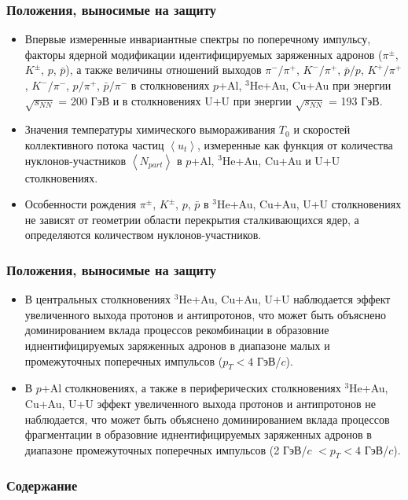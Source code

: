 \begin{frame}
    \setcounter{framenumber}{1}
    \maketitle
\end{frame}

\begin{frame}
    \frametitle{Положения, выносимые на защиту}
    \begin{itemize}
       	\item Впервые измеренные инвариантные спектры по поперечному импульсу, факторы ядерной модификации идентифицируемых заряженных адронов ($\pi^{\pm}$, $K^{\pm}$, $p$, $\bar{p}$), а также величины отношений выходов $\pi^{-}/\pi^{+}$, $K^{-}/\pi^{+}$, $\bar{p}/p$, $K^{+}/\pi^{+}$, $K^{-}/\pi^{-}$, $p/\pi^{+}$, $\bar{p}/\pi^{-}$ в столкновениях  $p$+Al, $^{3}$He+Au, Cu+Au при энергии $\sqrt{s_{NN}}$ = 200 ГэВ и в столкновениях U+U при энергии $\sqrt{s_{NN}}$ = 193 ГэВ. 
       
       \item Значения температуры химического вымораживания $T_0$ и скоростей коллективного потока частиц $\left< u_{t} \right>$, измеренные как функция от количества нуклонов-участников $\left< N_{part} \right>$ в $p$+Al, $^{3}$He+Au, Cu+Au и U+U столкновениях.
       
       \item Особенности рождения $\pi^{\pm}$, $K^{\pm}$, $p$, $\bar{p}$ в $^{3}$He+Au, Cu+Au, U+U  столкновениях не зависят от геометрии области перекрытия сталкивающихся ядер, а определяются количеством нуклонов-участников.
        \end{itemize}
 \end{frame}  
 
 \begin{frame}
 	\frametitle{Положения, выносимые на защиту}
 	\begin{itemize}
       \item В центральных столкновениях $^{3}$He+Au, Cu+Au, U+U наблюдается эффект увеличенного выхода протонов и антипротонов, что может быть объяснено доминированием вклада процессов рекомбинации в образовние иднентифицируемых заряженных адронов в диапазоне малых и промежуточных поперечных импульсов ($p_{T}<4$ ГэВ/$c$). 
       
       \item В $p$+Al столкновениях, а также в периферических столкновениях $^{3}$He+Au, Cu+Au, U+U эффект увеличенного выхода протонов и антипротонов не наблюдается, что может быть объяснено доминированием вклада процессов фрагментации в образовние иднентифицируемых заряженных адронов в диапазоне промежуточных поперечных импульсов (2 ГэВ/$c$ $<p_{T}<4$ ГэВ/$c$).
    \end{itemize}
\end{frame}

\begin{frame}
    \frametitle{Содержание}
    \tableofcontents
\end{frame}
